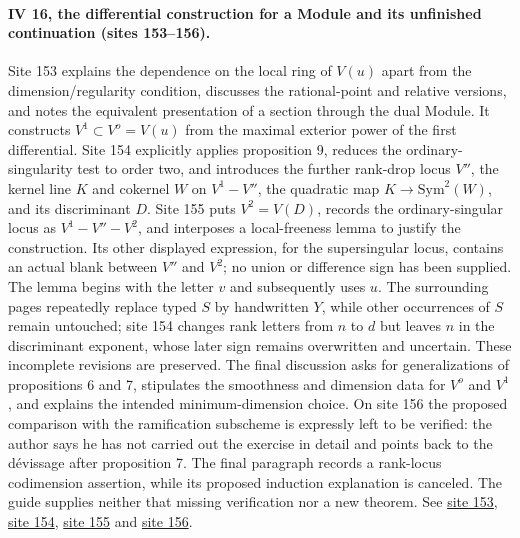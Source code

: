 \paragraph{IV 16, the differential construction for a Module and its unfinished continuation (sites 153--156).}
Site 153 explains the dependence on the local ring of $V(u)$ apart from the dimension/regularity condition, discusses the rational-point and relative versions, and notes the equivalent presentation of a section through the dual Module. It constructs $V^1\subset V^o=V(u)$ from the maximal exterior power of the first differential. Site 154 explicitly applies proposition 9, reduces the ordinary-singularity test to order two, and introduces the further rank-drop locus $V''$, the kernel line $K$ and cokernel $W$ on $V^1-V''$, the quadratic map $K\longrightarrow\mathrm{Sym}^2(W)$, and its discriminant $D$. Site 155 puts $V^2=V(D)$, records the ordinary-singular locus as $V^1-V''-V^2$, and interposes a local-freeness lemma to justify the construction. Its other displayed expression, for the supersingular locus, contains an actual blank between $V''$ and $V^2$; no union or difference sign has been supplied. The lemma begins with the letter $v$ and subsequently uses $u$. The surrounding pages repeatedly replace typed $S$ by handwritten $Y$, while other occurrences of $S$ remain untouched; site 154 changes rank letters from $n$ to $d$ but leaves $n$ in the discriminant exponent, whose later sign remains overwritten and uncertain. These incomplete revisions are preserved. The final discussion asks for generalizations of propositions 6 and 7, stipulates the smoothness and dimension data for $V^o$ and $V^1$, and explains the intended minimum-dimension choice. On site 156 the proposed comparison with the ramification subscheme is expressly left to be verified: the author says he has not carried out the exercise in detail and points back to the dévissage after proposition 7. The final paragraph records a rank-locus codimension assertion, while its proposed induction explanation is canceled. The guide supplies neither that missing verification nor a new theorem. See \href{https://grothendieck.umontpellier.fr/web/viewer.html?file=../25.pdf#page=154}{site 153}, \href{https://grothendieck.umontpellier.fr/web/viewer.html?file=../25.pdf#page=155}{site 154}, \href{https://grothendieck.umontpellier.fr/web/viewer.html?file=../25.pdf#page=156}{site 155} and \href{https://grothendieck.umontpellier.fr/web/viewer.html?file=../25.pdf#page=157}{site 156}.
